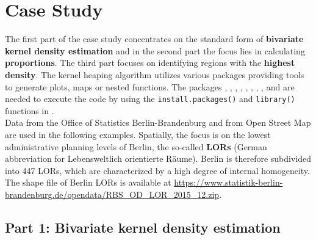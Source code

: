 \section{Case Study}
The first part of the case study concentrates on the standard form of \textbf{bivariate kernel density estimation} and in the second part the focus lies in calculating \textbf{proportions}. 
The third part focuses on identifying regions with the \textbf{highest density}.  
The kernel heaping algorithm utilizes various packages providing tools to generate plots, maps or nested functions. The packages 
\hyperlink{https://cran.r-project.org/web/packages/fields/index.html}{},
\hyperlink{https://cran.r-project.org/web/packages/ggplot2/index.html}{},
\hyperlink{https://cran.r-project.org/web/packages/RColorBrewer/index.html}{},
\hyperlink{https://cran.r-project.org/web/packages/dplyr/index.html}{}, 
\hyperlink{https://cran.r-project.org/web/packages/terra/index.html}{},
\hyperlink{https://cran.r-project.org/web/packages/sp/index.html}{},
\hyperlink{https://cran.r-project.org/web/packages/sf/index.html}{},
\hyperlink{https://cran.r-project.org/web/packages/patchwork/index.html}{},
\hyperlink{https://cran.r-project.org/web/packages/rmapshaper/index.html}{}
and 
\hyperlink{https://cran.r-project.org/web/packages/Kernelheaping/index.html}{} are needed to execute the code by using the 
\texttt{install.packages()} and \texttt{library()} functions in . 
\\


Data from the Office of Statistics Berlin-Brandenburg and from Open Street Map are used in the following examples. Spatially, the focus is on the lowest administrative planning levels of Berlin, the so-called \textbf{LORs} (German abbreviation for Lebensweltlich orientierte Räume). Berlin is therefore subdivided into 447 LORs, which are characterized by a high degree of internal homogeneity. The shape file of Berlin LORs is available at \url{https://www.statistik-berlin-brandenburg.de/opendata/RBS_OD_LOR_2015_12.zip}.

\subsection{Part 1: Bivariate kernel density estimation}

